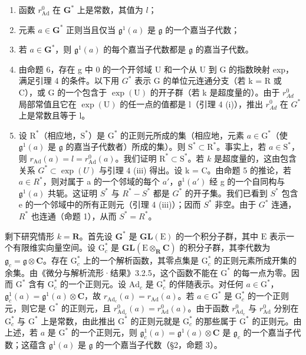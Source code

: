 \begin{enumerate}
\def\labelenumi{(\roman{enumi})}
\item
  函数 \(r_{\mathrm{Ad}}^0\) 在 \(\mathbf{G}^*\) 上是常数，其值为 \(l\)；
\item
  元素 \(a \in \mathbf{G}^*\) 正则当且仅当 \(\mathfrak{g}^1(a)\) 是 \(\mathfrak{g}\) 的一个嘉当子代数；
\item
  若 \(a \in \mathbf{G}^*\)，则 \(\mathfrak{g}^1(a)\) 的每个嘉当子代数都是 \(\mathfrak{g}\) 的嘉当子代数。
\item
  由命题 6，存在 g 中 0 的一个开邻域 U 和一个从 U 到 G 的指数映射 exp，满足引理 4 的条件。以下用 \(G^{*}\) 表示 G 的单位元连通分支（若 k = R 或 C），或 G 的一个包含于 \(\exp(\mathrm{U})\) 的开子群（若 k 是超度量的）。由于 \(r_{Ad}^{0}\) 局部常值且它在 \(\exp(\mathrm{U})\) 的任一点的值都是 l（引理 4 (i)），推出 \(r_{Ad}^{0}\) 在 \(G^{*}\) 上是常数且等于 l。
\item
  设 \(\mathrm{R}^*\)（相应地，\(\mathrm{S}^*\)）是 \(\mathrm{G}^*\) 的正则元所成的集（相应地，元素 \(a \in \mathrm{G}^*\)（使 \(\mathfrak{g}^1(a)\) 是 \(\mathfrak{g}\) 的嘉当子代数者）所成的集）。则 \(\mathrm{S}^* \subset \mathrm{R}^*\)。事实上，若 \(a \in \mathrm{S}^*\)，则 \(r_{\mathrm{Ad}}(a) = l = r_{\mathrm{Ad}}^0(a)\)。我们证明 \(\mathrm{R}^* \subset \mathrm{S}^*\)。若 \(k\) 是超度量的，这由包含关系 \(G^{*} \subset \exp(U)\) 与引理 4 (iii) 得出。设 k = C。由命题 5 的推论，若 \(a \in R^{*}\)，则对属于 a 的一个邻域的每个 \(a'\)，\(\mathfrak{g}^{1}(a')\) 经 g 的一个自同构与 \(\mathfrak{g}^{1}(a)\) 共轭。这证明 \(S^{*}\) 与 \(R^{*} - S^{*}\) 都是 \(G^{*}\) 的开子集。我们已看到 \(S^{*}\) 包含 e 的一个邻域中的所有正则元（引理 4 (iii)）；因而 \(S^{*}\) 非空。由于 \(G^{*}\) 连通，\(R^{*}\) 也连通（命题 1），从而 \(S^{*} = R^{*}\)。
\end{enumerate}

剩下研究情形 \(k = \mathbf{R}\)。首先设 \(\mathbf{G}^*\) 是 \(\mathbf{GL}(\mathrm{E})\) 的一个积分子群，其中 \(\mathrm{E}\) 表示一个有限维实向量空间。设 \(\mathrm{G}_c^*\) 是 \(\mathbf{GL}(\mathrm{E} \otimes_{\mathbf{R}} \mathbf{C})\) 的积分子群，其李代数为 \(\mathfrak{g}_c = \mathfrak{g} \otimes \mathbf{C}\)。存在 \(\mathrm{G}_c^*\) 上的一个解析函数，其零点集是 \(\mathrm{G}_c^*\) 的正则元素所成开集的余集。由《微分与解析流形·结果》3.2.5，这个函数不能在 \(\mathrm{G}^*\) 的每一点为零。因而 \(\mathrm{G}^*\) 含有 \(\mathrm{G}_c^*\) 的一个正则元。设 \(\mathrm{Ad}_c\) 是 \(\mathrm{G}_c^*\) 的伴随表示。对任何 \(a \in \mathrm{G}^*\)，\(\mathfrak{g}_c^1(a) = \mathfrak{g}^1(a) \otimes \mathbf{C}\)，故 \(r_{\mathrm{Ad}_c}(a) = r_{\mathrm{Ad}}(a)\)。若 \(a \in \mathrm{G}^*\) 是 \(\mathrm{G}_c^*\) 的一个正则元，则它是 \(\mathrm{G}^*\) 的正则元，且 \(r_{\mathrm{Ad}_c}^0(a) = r_{\mathrm{Ad}}^0(a)\)。由于函数 \(r_{\mathrm{Ad}_c}^0\) 与 \(r_{\mathrm{Ad}}^0\) 分别在 \(\mathrm{G}_c^*\) 与 \(\mathrm{G}^*\) 上是常数，由此推出 \(\mathrm{G}^*\) 的正则元就是 \(\mathrm{G}_c^*\) 的那些属于 \(\mathrm{G}^*\) 的正则元。由上述，若 \(a\) 是 \(\mathrm{G}^*\) 的一个正则元，则 \(\mathfrak{g}_c^1(a) = \mathfrak{g}^1(a) \otimes \mathbf{C}\) 是 \(\mathfrak{g}_c\) 的一个嘉当子代数；这蕴含 \(\mathfrak{g}^1(a)\) 是 \(\mathfrak{g}\) 的一个嘉当子代数（§2，命题 3）。


